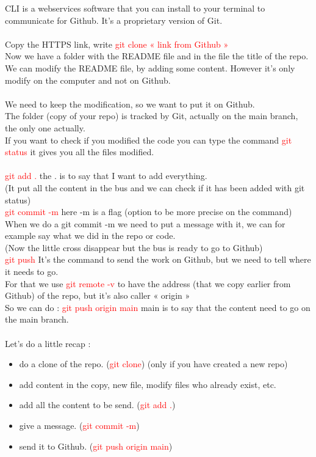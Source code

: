 \documentclass{article}
\begin{document}
CLI is a webservices software that you can install to your terminal to communicate for Github. It's a proprietary version of Git. \\ \\
Copy the HTTPS link, write \textcolor{red}{git clone « link from Github »} \\
Now we have a folder with the README file and in the file the title of the repo. \\
We can modify the README file, by adding some content. However it's only modify on the computer and not on Github. \\ \\
We need to keep the modification, so we want to put it on Github. \\
The folder (copy of your repo) is tracked by Git, actually on the main branch, the only one actually. \\
If you want to check if you modified the code you can type the command \textcolor{red}{git status} it gives you all the files modified. \\ \\
\textcolor{red}{git add .} the . is to say that I want to add everything. \\
(It put all the content in the bus and we can check if it has been added with git status) \\
\textcolor{red}{git commit -m} here -m is a flag (option to be more precise on the command) \\
When we do a git commit -m we need to put a message with it, we can for example say what we did in the repo or code. \\
(Now the little cross disappear but the bus is ready to go to Github) \\
\textcolor{red}{git push} It's the command to send the work on Github, but we need to tell where it needs to go. \\
For that we use \textcolor{red}{git remote -v} to have the address (that we copy earlier from Github) of the repo, but it's also caller « origin » \\
So we can do : \textcolor{red}{git push origin main} main is to say that the content need to go on the main branch. \\ \\
Let's do a little recap : 
\begin{itemize}
    \item do a clone of the repo. (\textcolor{red}{git clone}) (only if you have created a new repo)
    \item add content in the copy, new file, modify files who already exist, etc.
    \item add all the content to be send. (\textcolor{red}{git add .})
    \item give a message. (\textcolor{red}{git commit -m})
    \item send it to Github. (\textcolor{red}{git push origin main})
\end{itemize}
\end{document}
